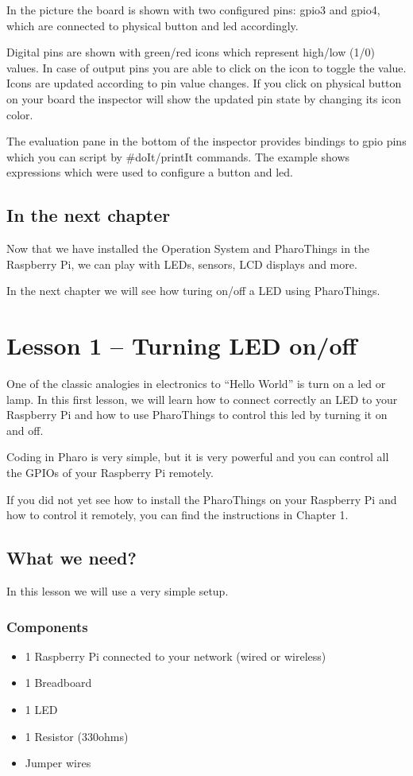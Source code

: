 \documentclass[10pt,twoside,english]{_support/latex/sbabook/sbabook}
\begin{document}
In the picture the board is shown with two configured pins: gpio3 and gpio4, which are connected to physical button and led accordingly.

Digital pins are shown with green/red icons which represent high/low (1/0) values. In case of output pins you are able to click on the icon to toggle the value. Icons are updated according to pin value changes. If you click on physical button on your board the inspector will show the updated pin state by changing its icon color.

The evaluation pane in the bottom of the inspector provides bindings to gpio pins which you can script by \#doIt/printIt commands. The example shows expressions which were used to configure a button and led.
\section{In the next chapter}
Now that we have installed the Operation System and PharoThings in the Raspberry Pi, we can play with LEDs, sensors, LCD displays and more. 

In the next chapter we will see how turing on/off a LED using PharoThings. 
\chapter{Lesson 1 – Turning LED on/off}
One of the classic analogies in electronics to “Hello World” is turn on a led or lamp. In this first lesson, we will learn how to connect correctly an LED to your Raspberry Pi and how to use PharoThings to control this led by turning it on and off.

Coding in Pharo is very simple, but it is very powerful and you can control all the GPIOs of your Raspberry Pi remotely.

If you did not yet see how to install the PharoThings on your Raspberry Pi and how to control it remotely, you can find the instructions in Chapter 1.
\section{What we need?}
In this lesson we will use a very simple setup.
\subsection{Components}
\begin{itemize}
\item 1 Raspberry Pi connected to your network (wired or wireless)
\item 1 Breadboard
\item 1 LED
\item 1 Resistor (330ohms)
\item Jumper wires
\end{itemize}
\end{document}
